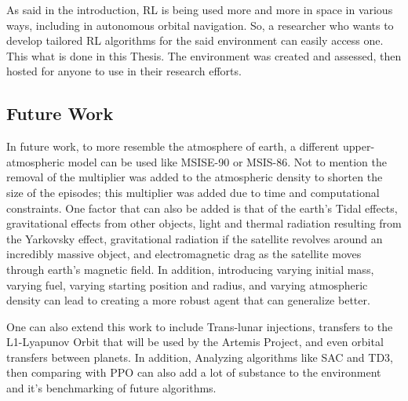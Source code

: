 As said in the introduction, RL is being used more and more in space in various ways, including in autonomous orbital navigation. So, a researcher who wants to develop tailored RL algorithms for the said environment can easily access one. This what is done in this Thesis. The environment was created and assessed, then hosted for anyone to use in their research efforts.

\subsection{Future Work}

In future work, to more resemble the atmosphere of earth, a different upper-atmospheric model can be used like MSISE-90 or MSIS-86. Not to mention the removal of the multiplier was added to the atmospheric density to shorten the size of the episodes; this multiplier was added due to time and computational constraints. One factor that can also be added is that of the earth's Tidal effects, gravitational effects from other objects, light and thermal radiation resulting from the Yarkovsky effect, gravitational radiation if the satellite revolves around an incredibly massive object, and electromagnetic drag as the satellite moves through earth's magnetic field. In addition, introducing varying initial mass, varying fuel, varying starting position and radius, and varying atmospheric density can lead to creating a more robust agent that can generalize better. 

One can also extend this work to include Trans-lunar injections, transfers to the L1-Lyapunov Orbit that will be used by the Artemis Project, and even orbital transfers between planets. In addition, Analyzing algorithms like SAC and TD3, then comparing with PPO can also add a lot of substance to the environment and it's benchmarking of future algorithms. 